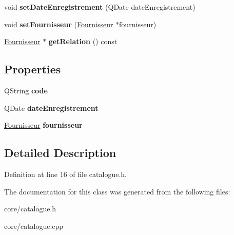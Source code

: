 \begin{DoxyCompactItemize}
\item 
\hypertarget{classcore_1_1_catalogue_a2e6146f3ebebe972b347986bab8c73a2}{
void {\bfseries setDateEnregistrement} (QDate dateEnregistrement)}
\label{d6/d6b/classcore_1_1_catalogue_a2e6146f3ebebe972b347986bab8c73a2}

\item 
\hypertarget{classcore_1_1_catalogue_a228687a6fc0a52c636abc9472967a51c}{
void {\bfseries setFournisseur} (\hyperlink{class_fournisseur}{Fournisseur} $\ast$fournisseur)}
\label{d6/d6b/classcore_1_1_catalogue_a228687a6fc0a52c636abc9472967a51c}

\item 
\hypertarget{classcore_1_1_catalogue_a481785a1f1fa630ae9b1c0abc74e35a7}{
\hyperlink{class_fournisseur}{Fournisseur} $\ast$ {\bfseries getRelation} () const }
\label{d6/d6b/classcore_1_1_catalogue_a481785a1f1fa630ae9b1c0abc74e35a7}

\end{DoxyCompactItemize}
\subsection*{Properties}
\begin{DoxyCompactItemize}
\item 
\hypertarget{classcore_1_1_catalogue_aa45852f9167142c627f4f926de585276}{
QString {\bfseries code}}
\label{d6/d6b/classcore_1_1_catalogue_aa45852f9167142c627f4f926de585276}

\item 
\hypertarget{classcore_1_1_catalogue_aecb76ca473b4c7b5904e8bb891d83d98}{
QDate {\bfseries dateEnregistrement}}
\label{d6/d6b/classcore_1_1_catalogue_aecb76ca473b4c7b5904e8bb891d83d98}

\item 
\hypertarget{classcore_1_1_catalogue_aa4a85ccd0af291352ec97e8ac5eb13ad}{
\hyperlink{class_fournisseur}{Fournisseur} {\bfseries fournisseur}}
\label{d6/d6b/classcore_1_1_catalogue_aa4a85ccd0af291352ec97e8ac5eb13ad}

\end{DoxyCompactItemize}


\subsection{Detailed Description}


Definition at line 16 of file catalogue.h.



The documentation for this class was generated from the following files:\begin{DoxyCompactItemize}
\item 
core/catalogue.h\item 
core/catalogue.cpp\end{DoxyCompactItemize}
